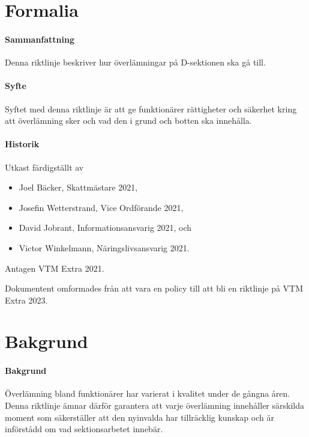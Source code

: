 \documentclass{dsekguideline}
\begin{document}
\maketitle
\section{Formalia}

\paragraph{Sammanfattning}
Denna riktlinje beskriver hur överlämningar på D-sektionen ska gå till.

\paragraph{Syfte}
Syftet med denna riktlinje är att ge funktionärer rättigheter och säkerhet kring
att överlämning sker och vad den i grund och botten ska innehålla.

\paragraph{Historik}
Utkast färdigställt av
\begin{itemize}
  \item Joel Bäcker, Skattmästare 2021,
  \item Josefin Wetterstrand, Vice Ordförande 2021,
  \item David Jobrant, Informationsansvarig 2021, och
  \item Victor Winkelmann, Näringslivsansvarig 2021.
  \end{itemize}
Antagen VTM Extra 2021.

Dokumentent omformades från att vara en policy till att bli en riktlinje på
VTM Extra 2023.

\section{Bakgrund}

\paragraph{Bakgrund}
Överlämning bland funktionärer har varierat i kvalitet under de gångna
åren. Denna riktlinje ämnar därför garantera att varje överlämning innehåller
särskilda moment som säkerställer att den nyinvalda har tillräcklig kunskap
och är införstådd om vad sektionsarbetet innebär.
\end{document}
